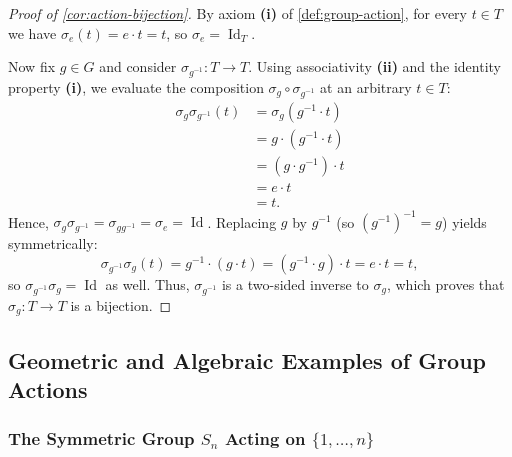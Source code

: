 \begin{content}

\begin{proof}[Proof of \cref{cor:action-bijection}]
By axiom \textbf{(i)} of \cref{def:group-action}, for every $t \in T$ we have $\sigma_e(t) = e \cdot t = t$, so $\sigma_e = \operatorname{Id}_T$.

Now fix $g \in G$ and consider $\sigma_{g^{-1}} \colon T \to T$. Using associativity \textbf{(ii)} and the identity property \textbf{(i)}, we evaluate the composition $\sigma_g \circ \sigma_{g^{-1}}$ at an arbitrary $t \in T$:
\begin{align*}
\sigma_g \sigma_{g^{-1}}(t) &= \sigma_g(g^{-1} \cdot t) \\
&= g \cdot (g^{-1} \cdot t) \\
&= (g \cdot g^{-1}) \cdot t \\
&= e \cdot t \\
&= t.
\end{align*}
Hence, $\sigma_g \sigma_{g^{-1}} = \sigma_{g g^{-1}} = \sigma_e = \operatorname{Id}$. Replacing $g$ by $g^{-1}$ (so $(g^{-1})^{-1} = g$) yields symmetrically:
\[
\sigma_{g^{-1}} \sigma_g(t) = g^{-1} \cdot (g \cdot t) = (g^{-1} \cdot g) \cdot t = e \cdot t = t,
\]
so $\sigma_{g^{-1}} \sigma_g = \operatorname{Id}$ as well. Thus, $\sigma_{g^{-1}}$ is a two-sided inverse to $\sigma_g$, which proves that $\sigma_g \colon T \to T$ is a bijection.
\end{proof}
\end{content}

\subsection{Geometric and Algebraic Examples of Group Actions}

\subsubsection{The Symmetric Group \texorpdfstring{$S_n$}{S\_n} Acting on \texorpdfstring{$\{1, \dots, n\}$}{\{1, ..., n\}}}

